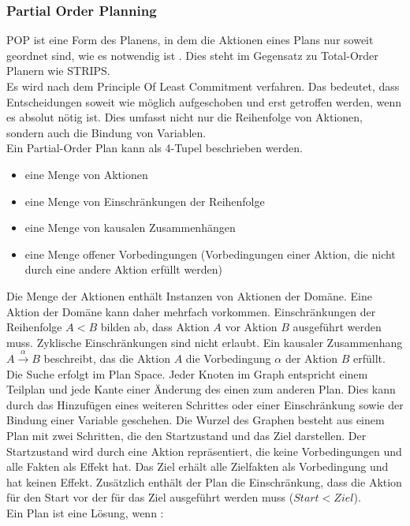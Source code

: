 \subsubsection{Partial Order Planning}{\label{section:pop}}
\ac{POP} ist eine Form des Planens, in dem die Aktionen eines Plans nur soweit geordnet sind, wie es notwendig ist \cite{dyer_2003}.
Dies steht im Gegensatz zu Total-Order Planern wie \ac{STRIPS}.\\
Es wird nach dem Principle Of Least Commitment verfahren.
Das bedeutet, dass Entscheidungen soweit wie möglich aufgeschoben und erst getroffen werden, wenn es absolut nötig ist.
Dies umfasst nicht nur die Reihenfolge von Aktionen, sondern auch die Bindung von Variablen.\\
Ein Partial-Order Plan kann als 4-Tupel \cite{grastien} beschrieben werden.
\begin{itemize}
    \item eine Menge von Aktionen
    \item eine Menge von Einschränkungen der Reihenfolge
    \item eine Menge von kausalen Zusammenhängen
    \item eine Menge offener Vorbedingungen (Vorbedingungen einer Aktion, die nicht durch eine andere Aktion erfüllt werden)
\end{itemize}
Die Menge der Aktionen enthält Instanzen von Aktionen der Domäne.
Eine Aktion der Domäne kann daher mehrfach vorkommen.
Einschränkungen der Reihenfolge $A < B$ bilden ab, dass Aktion $A$ vor Aktion $B$ ausgeführt werden muss.
Zyklische Einschränkungen sind nicht erlaubt.
Ein kausaler Zusammenhang $A \xrightarrow{\alpha} B$ beschreibt, das die Aktion $A$ die Vorbedingung $\alpha$ der Aktion $B$ erfüllt.\\
Die Suche erfolgt im Plan Space.
Jeder Knoten im Graph entspricht einem Teilplan und jede Kante einer Änderung des einen zum anderen Plan.
Dies kann durch das Hinzufügen eines weiteren Schrittes oder einer Einschränkung sowie der Bindung einer Variable geschehen.
Die Wurzel des Graphen besteht aus einem Plan mit zwei Schritten, die den Startzustand und das Ziel darstellen.
Der Startzustand wird durch eine Aktion repräsentiert, die keine Vorbedingungen und alle Fakten als Effekt hat.
Das Ziel erhält alle Zielfakten als Vorbedingung und hat keinen Effekt.
Zusätzlich enthält der Plan die Einschränkung, dass die Aktion für den Start vor der für das Ziel ausgeführt werden muss ($Start < Ziel$).\\
Ein Plan ist eine Lösung, wenn \cite{grastien}:
